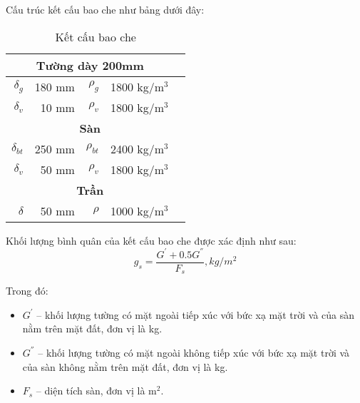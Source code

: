 Cấu trúc kết cấu bao che như bảng dưới đây:

\begin{wraptable}[13]{l}{0.4\textwidth}
	\caption{Kết cấu bao che}
	\begin{tabular}{|r|r|r|r|r|}
		\hline
		\multicolumn{4}{|c|}{\textbf{Tường dày 200mm}} \bigstrut\\
		\hline
		\textbf{{\large $\delta_{g}$}} & 180 mm & {\large $\rho_{g}$} & 1800 kg/m$^3$ \bigstrut\\
		\hline
		{\large $\delta_{v}$} & 10 mm & \textbf{{\large $\rho_{v}$}} & 1800 kg/m$^3$ \bigstrut\\
		\hline
		\multicolumn{4}{|c|}{\textbf{Sàn}} \bigstrut\\
		\hline
		\textbf{{\large $\delta_{bt}$}} & 250 mm & {\large $\rho_{bt}$} & 2400 kg/m$^3$ \bigstrut\\
		\hline
		\textbf{{\large $\delta_{v}$}} & 50 mm & \textbf{{\large $\rho_{v}$}} & 1800 kg/m$^3$ \bigstrut\\
		\hline
		\multicolumn{4}{|c|}{\textbf{Trần}} \bigstrut\\
		\hline
		\textbf{{\large $\delta$}} & 50 mm & \textbf{{\large $\rho$}} & 1000 kg/m$^3$ \bigstrut\\
		\hline
	\end{tabular}
	\label{b:kcbc}%
\end{wraptable}%

\vspace{0.5cm}
Khối lượng bình quân của kết cấu bao che được xác định như sau:
\begin{equation*}
	g_{s} = \dfrac{G^{'}+0.5G^{''}}{F_{s}}, kg/m^2 
\end{equation*}

Trong đó:
\begin{itemize}
	\item $G^{'}$ -- khối lượng tường có mặt ngoài tiếp xúc với bức xạ mặt trời và của sàn nằm trên mặt đất, đơn vị là kg.
	\item $G^{''}$ -- khối lượng tường có mặt ngoài không tiếp xúc với bức xạ mặt trời và của sàn không nằm trên mặt đất, đơn vị là kg.
	\item $F_{s}$ -- diện tích sàn, đơn vị là m$^2$.
\end{itemize}


